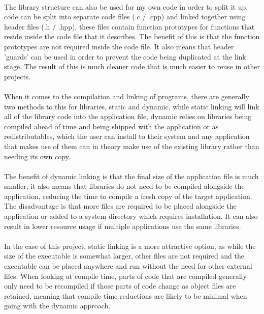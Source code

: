 \paragraph{}
The library structure can also be used for my own code in order to split it up, code can be split into separate code files (.c / .cpp) and linked together using header files (.h / .hpp), these files contain function prototypes for functions that reside inside the code file that it describes. The benefit of this is that the function prototypes are not required inside the code file. It also means that header 'guards' can be used in order to prevent the code being duplicated at the link stage.  The result of this is much cleaner code that is much easier to reuse in other projects.

\paragraph{}
When it comes to the compilation and linking of programs, there are generally two methods to this for libraries, static and dynamic, while static linking will link all of the library code into the application file, dynamic relies on libraries being compiled ahead of time and being shipped with the application or as redistributables, which the user can install to their system and any application that makes use of them can in theory make use of the existing library rather than needing its own copy.

\paragraph{}
The benefit of dynamic linking is that the final size of the application file is much smaller, it also means that libraries do not need to be compiled alongside the application, reducing the time to compile a fresh copy of the target application. The disadvantage is that more files are required to be placed alongside the application or added to a system directory which requires installation. It can also result in lower resource usage if multiple applications use the same libraries.

\paragraph{}
In the case of this project, static linking is a more attractive option, as while the size of the executable is somewhat larger, other files are not required and the executable can be placed anywhere and run without the need for other external files. When looking at compile time, parts of code that are compiled generally only need to be recompiled if those parts of code change as object files are retained, meaning that compile time reductions are likely to be minimal when going with the dynamic approach.

